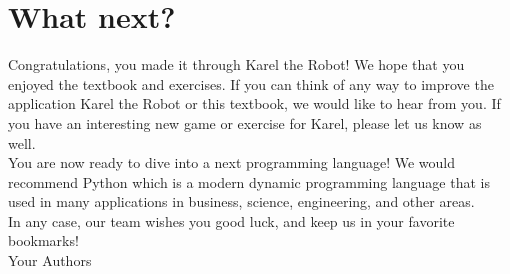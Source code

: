 \section{What next?}

Congratulations, you made it through Karel the Robot! We hope that you 
enjoyed the textbook and exercises. If you can think of any way to 
improve the application Karel the Robot or this textbook, we would like
to hear from you. If you have an interesting new game or exercise for 
Karel, please let us know as well. \\

\noindent
You are now ready to dive into a next programming language! We would 
recommend Python which is a modern dynamic programming 
language that is used in many applications in business, science,
engineering, and other areas.\\

\noindent
In any case, our team wishes you good luck, and keep us in your 
favorite bookmarks! \\

\hbox{} \hfill{} Your Authors


